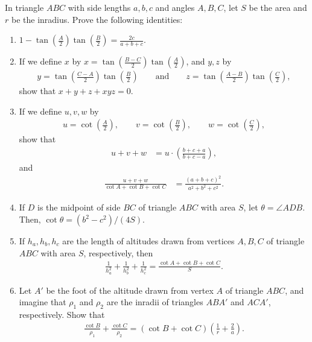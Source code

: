 \documentclass[12pt,a4paper]{memoir}
\theoremstyle{definition}
\begin{document}
\begin{question}[name=Identities in Laws of Tangents \& Cotangents]
		In triangle $ABC$ with side lengths $a,b,c$ and angles $A,B,C$, let $S$ be the area and $r$ be the inradius. Prove the following identities:
		\begin{enumerate}
			\item $\displaystyle 1 - \tan\left(\frac{A}{2}\right)\tan\left(\frac{B}{2}\right)=\frac{2c}{a+b+c}$.
			\item If we define $x$ by $x = \displaystyle \tan\left(\frac{B-C}{2}\right)\tan\left(\frac{A}{2}\right)$, and $y,z$ by
			\begin{align*}
				y = \tan\left(\frac{C-A}{2}\right)\tan\left(\frac{B}{2}\right)\qquad \text{and} \qquad
				z = \tan\left(\frac{A-B}{2}\right)\tan\left(\frac{C}{2}\right),
			\end{align*}
			show that $x+y+z+xyz=0$.
			\item If we define $u,v,w$ by
			\begin{align*}
				u=\cot\left(\frac{A}{2}\right), \qquad v=\cot\left(\frac{B}{2}\right), \qquad w=\cot\left(\frac{C}{2}\right),
			\end{align*}
			show that
			\begin{align*}
				u+v+w &=u\cdot \left(\frac{b+c+a}{b+c-a}\right),
			\end{align*}
			and
			\begin{align*}
				\frac{u+v+w}{\cot A + \cot B + \cot C} &= \frac{(a+b+c)^2}{a^2+b^2+c^2}.
			\end{align*}
			\item If $D$ is the midpoint of side $BC$ of triangle $ABC$ with area $S$, let $\theta=\angle ADB$. Then, $\cot \theta = (b^2-c^2)/(4S)$.
			\item If $h_a,h_b,h_c$ are the length of altitudes drawn from vertices $A,B,C$ of triangle $ABC$ with area $S$, respectively, then
			\begin{align*}
				\frac{1}{h_a^2}+\frac{1}{h_b^2}+\frac{1}{h_c^2}=\frac{\cot A + \cot B + \cot C}{S}.
			\end{align*}
			\item Let $A'$ be the foot of the altitude drawn from vertex $A$ of triangle $ABC$, and imagine that $\rho_1$ and $\rho_2$ are the inradii of triangles $ABA'$ and $ACA'$, respectively. Show that
			\begin{align*}
				\frac{\cot B}{\rho_1} + \frac{\cot C}{\rho_2} = \left(\cot B + \cot C\right)\left(\frac 1r + \frac 2a\right).
			\end{align*}
		\end{enumerate}
\end{question}
\end{document}

